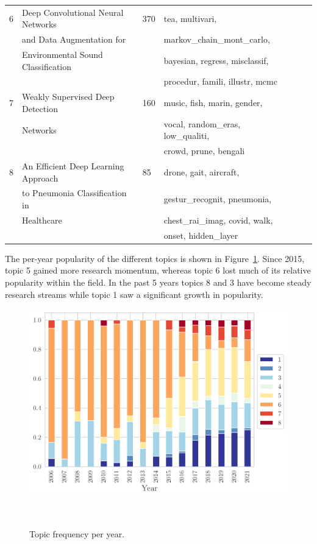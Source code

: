 \documentclass[pdflatex,sn-mathphys]{sn-jnl}%
\theoremstyle{thmstyleone}
\theoremstyle{thmstyletwo}
\theoremstyle{thmstylethree}
\begin{document}
\begin{table}[ht]
\begin{center}
\begin{tabular*}{\textwidth}{@{\extracolsep{\fill}}lllllll@{\extracolsep{\fill}}}
        6 & Deep Convolutional Neural Networks & 370 & tea, multivari, \\
          & and Data Augmentation for && markov\_chain\_mont\_carlo, \\
          & Environmental Sound Classification && bayesian, regress, misclassif, \\
        \vspace{.2cm}  &&& procedur, famili, illustr, mcmc \\
        
        7 & Weakly Supervised Deep Detection & 160 & music, fish, marin, gender, \\
          & Networks && vocal, random\_eras, low\_qualiti, \\
        \vspace{.2cm}  &&& crowd, prune, bengali \\
        
        8 & An Efficient Deep Learning Approach & 85 & drone, gait, aircraft, \\      
          & to Pneumonia Classification in && gestur\_recognit, pneumonia, \\
          & Healthcare && chest\_rai\_imag, covid, walk, \\
          &&& onset, hidden\_layer \\
        \bottomrule
    \end{tabular*}
    \end{center}
\end{table}

The per-year popularity of the different topics is shown in
Figure~\ref{fig:topics_per_year}. Since 2015, topic 5 gained more research
momentum, whereas topic 6 lost much of its relative popularity within the
field. In the past 5 years topics 8 and 3 have become steady research streams
while topic 1 saw a significant growth in popularity. 

\begin{figure}[H]
	\centering
    \includegraphics[width=\linewidth]{../analysis/topics_per_year}
    \caption{Topic frequency per year.
    }~\label{fig:topics_per_year}
\end{figure}
\end{document}
